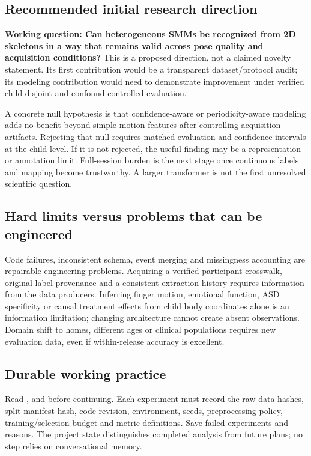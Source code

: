 \subsection{Recommended initial research direction}
\textbf{Working question: Can heterogeneous SMMs be recognized from 2D skeletons in a way that remains valid across pose quality and acquisition conditions?} This is a proposed direction, not a claimed novelty statement. Its first contribution would be a transparent dataset/protocol audit; its modeling contribution would need to demonstrate improvement under verified child-disjoint and confound-controlled evaluation.

A concrete null hypothesis is that confidence-aware or periodicity-aware modeling adds no benefit beyond simple motion features after controlling acquisition artifacts. Rejecting that null requires matched evaluation and confidence intervals at the child level. If it is not rejected, the useful finding may be a representation or annotation limit. Full-session burden is the next stage once continuous labels and mapping become trustworthy. A larger transformer is not the first unresolved scientific question.

\subsection{Hard limits versus problems that can be engineered}
Code failures, inconsistent schema, event merging and missingness accounting are repairable engineering problems. Acquiring a verified participant crosswalk, original label provenance and a consistent extraction history requires information from the data producers. Inferring finger motion, emotional function, ASD specificity or causal treatment effects from child body coordinates alone is an information limitation; changing architecture cannot create absent observations. Domain shift to homes, different ages or clinical populations requires new evaluation data, even if within-release accuracy is excellent.

\subsection{Durable working practice}
Read ,  and  before continuing. Each experiment must record the raw-data hashes, split-manifest hash, code revision, environment, seeds, preprocessing policy, training/selection budget and metric definitions. Save failed experiments and reasons. The project state distinguishes completed analysis from future plans; no step relies on conversational memory.
